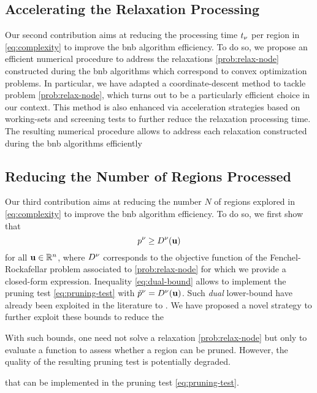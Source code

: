 \documentclass[11pt]{article}
\begin{document}
\subsection{Accelerating the Relaxation Processing}

Our second contribution aims at reducing the processing time $t_{\nu}$ per region in \eqref{eq:complexity} to improve the \gls{bnb} algorithm efficiency.
To do so, we propose an efficient numerical procedure to address the relaxations \eqref{prob:relax-node} constructed during the \gls{bnb} algorithms which correspond to convex optimization problems.
In particular, we have adapted a coordinate-descent method to tackle problem \eqref{prob:relax-node}, which turns out to be a particularly efficient choice in our context.
This method is also enhanced via acceleration strategies based on working-sets and screening tests to further reduce the relaxation processing time.
The resulting numerical procedure allows to address each relaxation constructed during the \gls{bnb} algorithms efficiently


\subsection{Reducing the Number of Regions Processed}

Our third contribution aims at reducing the number $N$ of regions explored in \eqref{eq:complexity} to improve the \gls{bnb} algorithm efficiency.
To do so, we first show that 
\begin{equation}
    \label{eq:dual-bound}
    p^\nu \geq D^\nu(\mathbf{u})
\end{equation}
for all $\dv \in \kR^{\pdim}$, where $D^\nu$ corresponds to the objective function of the Fenchel-Rockafellar problem associated to \eqref{prob:relax-node} for which we provide a closed-form expression.
Inequality \eqref{eq:dual-bound} allows to implement the pruning test \eqref{eq:pruning-test} with $\check{p}^\nu = D^\nu(\mathbf{u})$.
Such \emph{dual} lower-bound have already been exploited in the literature to .
We have proposed a novel strategy to further exploit these bounds to reduce the 


With such bounds, one need not solve a relaxation \eqref{prob:relax-node} but only to evaluate a function to assess whether a region can be pruned.
However, the quality of the resulting pruning test is potentially degraded.



that can be implemented in the pruning test \eqref{eq:pruning-test}.
\end{document}
